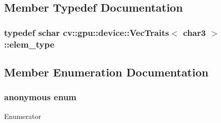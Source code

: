 \subsection{Member Typedef Documentation}
\hypertarget{structcv_1_1gpu_1_1device_1_1VecTraits_3_01char3_01_4_a017c0932607a35358a9cac4e2aeff577}{
\subsubsection[{elem\-\_\-type}]{\setlength{\rightskip}{0pt plus 5cm}typedef {\bf schar} {\bf cv\-::gpu\-::device\-::\-Vec\-Traits}$<$ char3 $>$\-::{\bf elem\-\_\-type}}}\label{structcv_1_1gpu_1_1device_1_1VecTraits_3_01char3_01_4_a017c0932607a35358a9cac4e2aeff577}


\subsection{Member Enumeration Documentation}
\hypertarget{structcv_1_1gpu_1_1device_1_1VecTraits_3_01char3_01_4_af956863fea74497c034a8b44019676de}{\subsubsection[{anonymous enum}]{\setlength{\rightskip}{0pt plus 5cm}anonymous enum}}\label{structcv_1_1gpu_1_1device_1_1VecTraits_3_01char3_01_4_af956863fea74497c034a8b44019676de}
\begin{Desc}
\item[Enumerator]\par
\begin{description}
\item[{\em 
\hypertarget{structcv_1_1gpu_1_1device_1_1VecTraits_3_01char3_01_4_af956863fea74497c034a8b44019676dea91cbf7ea679651b3c40f969919af5dd3}{cn}\label{structcv_1_1gpu_1_1device_1_1VecTraits_3_01char3_01_4_af956863fea74497c034a8b44019676dea91cbf7ea679651b3c40f969919af5dd3}
}]\end{description}
\end{Desc}


